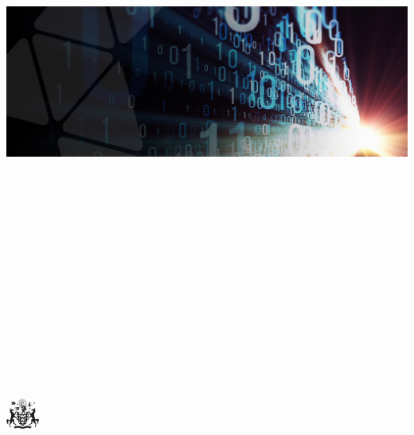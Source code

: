\documentclass{article}
\begin{document}
\includegraphics[width=950pt, height=570pt, keepaspectratio=true]{../corpics/binwall.png}

\includegraphics[width=31pt, height=29pt, keepaspectratio=true]{../corpics/UKAEA-arms.png}

{\huge{}{ \textbf{\exc \   }}}
\end{document}

